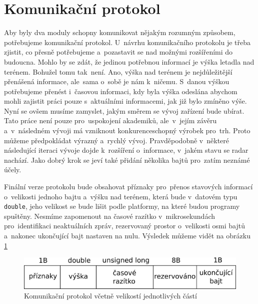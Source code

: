 	\section{Komunikační protokol}\label{navrhReseni::protokol}	
		Aby byly dva moduly schopny komunikovat nějakým rozumným způsobem, potřebujeme komunikační protokol.
		U~návrhu komunikačního protokolu je třeba zjistit, co přesně potřebujeme a~pozastavit se nad možnými rozšířeními do budoucna. Mohlo by se zdát, že jedinou potřebnou informací je výška letadla nad terénem. Bohužel tomu tak~není. Ano, výška nad terénem je nejdůležitější přenášená informace, ale~sama o~sobě je nám k~ničemu. S~danou výškou potřebujeme přenést i~časovou informaci, kdy byla výška odeslána abychom mohli zajistit práci pouze s~aktuálními informacemi, jak již bylo zmíněno výše. Nyní se ovšem musíme zamyslet, jakým směrem se vývoj zařízení bude ubírat. Tato práce není pouze pro~uspokojení akademiků, ale~v~jejím závěru a~v~následném vývoji má vzniknout konkurenceschopný výrobek pro~trh. Proto můžeme předpokládat výrazný a~rychlý vývoj. Pravděpodobně v~některé následující iteraci vývoje dojde k~rozšíření o~informace, v~jakém stavu se radar nachází. Jako dobrý krok se jeví také přidání několika bajtů pro~zatím neznámé účely.\par
		Finální verze protokolu bude obsahovat příznaky pro~přenos stavových informací o~velikosti jednoho bajtu a~výšku nad terénem, která bude v~datovém typu \texttt{double}, jeho velikost se bude lišit podle platformy, na které budou programy spuštěny. Nesmíme zapomenout na časové razítko v~mikrosekundách pro~identifikaci neaktuálních zpráv, rezervovaný prostor o~velikosti osmi bajtů a~nakonec ukončující bajt nastaven na nulu. Výsledek můžeme vidět na obrázku \ref{navrh::protokol}
		
		\begin{figure}[H]
			\begin{center}
				\includegraphics[scale=0.7]{obrazky-figures/protokol.png}
				\caption{Komunikační protokol včetně velikostí jednotlivých částí}
				\label{navrh::protokol}
			\end{center}
		\end{figure}
		

		
		
